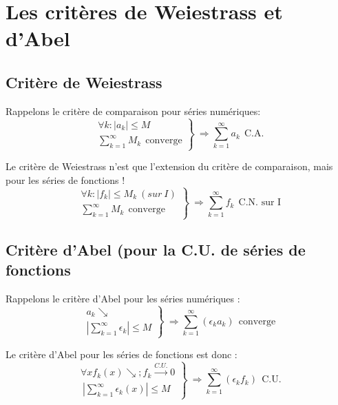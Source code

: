 \documentclass[11pt, a4paper, openany]{book}
\newcommand{\serie}{\sum_{k=1}^\infty}
\begin{document}
		\section{Les critères de Weiestrass et d'Abel}
		\subsection{Critère de Weiestrass}
		Rappelons le critère de comparaison pour séries numériques:
		\begin{equation}
			\left.\begin{array}{l}
			\forall k : |a_k| \leq M\\
			\serie M_k\ \ \text{converge}
			\end{array}\right\}\ \Rightarrow \serie a_k\ \ \text{C.A.}
		\end{equation}
							
		Le critère de Weiestrass n'est que l'extension du critère de comparaison, mais pour les séries de fonctions !
		\begin{equation}
			\left.\begin{array}{l}
			\forall k : |f_k| \leq M_k\ (sur\ I)\\
			\serie M_k\ \ \text{converge}
			\end{array}\right\}\ \Rightarrow \serie f_k\ \ \text{C.N. sur I}
		\end{equation}
							
							
		\setcounter{subsection}{2}
		\subsection{Critère d'Abel (pour la C.U. de séries de fonctions}
		Rappelons  le critère d'Abel pour les séries numériques :
		\begin{equation}
			\left.\begin{array}{l}
			a_k \searrow\\
			|\serie \epsilon_k| \leq M
			\end{array}\right\}\ \Rightarrow \serie (\epsilon_k a_k)\ \ \text{converge}
		\end{equation}
							
		Le critère d'Abel pour les séries de fonctions est donc :
		\begin{equation}
			\left.\begin{array}{l}
			\forall x f_k(x) \searrow ; f_k  \overset{C.U.}{\rightarrow} 0 \\\
			|\serie \epsilon_k(x)| \leq M
			\end{array}\right\}\ \Rightarrow \serie (\epsilon_k f_k)\ \ \text{C.U.}
		\end{equation}
							
\end{document}
